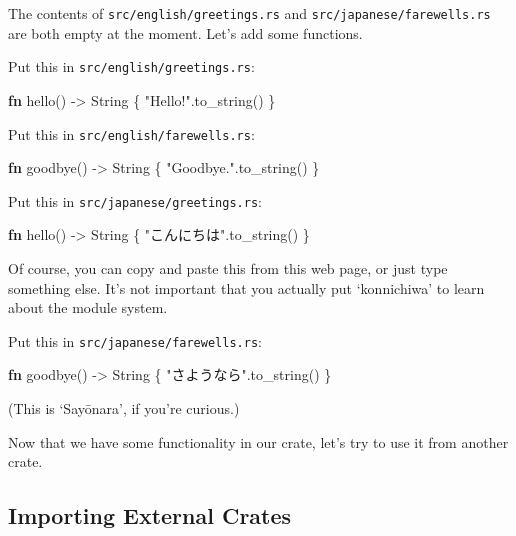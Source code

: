 \documentclass[a4paper,]{book}
\newenvironment{Shaded}{\begin{snugshade}}{\end{snugshade}}
\newcommand{\KeywordTok}[1]{\textcolor[rgb]{0.13,0.29,0.53}{\textbf{{#1}}}}
\newcommand{\StringTok}[1]{\textcolor[rgb]{0.31,0.60,0.02}{{#1}}}
\newcommand{\NormalTok}[1]{{#1}}
\begin{document}
The contents of \texttt{src/english/greetings.rs} and
\texttt{src/japanese/farewells.rs} are both empty at the moment. Let's
add some functions.

Put this in \texttt{src/english/greetings.rs}:

\begin{Shaded}
\begin{Highlighting}[]
\KeywordTok{fn} \NormalTok{hello() -> String \{}
    \StringTok{"Hello!"}\NormalTok{.to_string()}
\NormalTok{\}}
\end{Highlighting}
\end{Shaded}

Put this in \texttt{src/english/farewells.rs}:

\begin{Shaded}
\begin{Highlighting}[]
\KeywordTok{fn} \NormalTok{goodbye() -> String \{}
    \StringTok{"Goodbye."}\NormalTok{.to_string()}
\NormalTok{\}}
\end{Highlighting}
\end{Shaded}

Put this in \texttt{src/japanese/greetings.rs}:

\begin{Shaded}
\begin{Highlighting}[]
\KeywordTok{fn} \NormalTok{hello() -> String \{}
    \StringTok{"こんにちは"}\NormalTok{.to_string()}
\NormalTok{\}}
\end{Highlighting}
\end{Shaded}

Of course, you can copy and paste this from this web page, or just type
something else. It's not important that you actually put `konnichiwa' to
learn about the module system.

Put this in \texttt{src/japanese/farewells.rs}:

\begin{Shaded}
\begin{Highlighting}[]
\KeywordTok{fn} \NormalTok{goodbye() -> String \{}
    \StringTok{"さようなら"}\NormalTok{.to_string()}
\NormalTok{\}}
\end{Highlighting}
\end{Shaded}

(This is `Sayōnara', if you're curious.)

Now that we have some functionality in our crate, let's try to use it
from another crate.

\subsection{Importing External Crates}\label{importing-external-crates}
\end{document}
